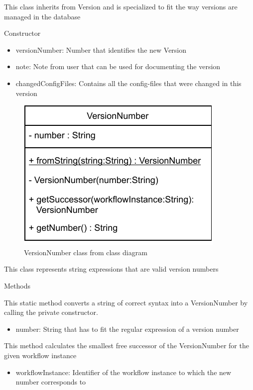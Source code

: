 This class inherits from Version and is specialized to fit the way versions are managed in the database
\begin{methodenv}{Constructor}



\begin{itemize}
	\item{versionNumber:}
	Number that identifies the new Version
	\item{note:}
	Note from user that can be used for documenting the version
	\item{changedConfigFiles:}
	Contains all the config-files that were changed in this version
\end{itemize}
\end{methodenv}


\begin{figure}[h]
\centerline{\includegraphics[scale=1]{res/Klassen/VersionNumber.pdf}}
\caption{VersionNumber class from class diagram}
\end{figure}

This class represents string expressions that are valid version numbers
\begin{methodenv}{Methods}

This static method converts a string of correct syntax into a VersionNumber by calling the private constructor.

\begin{itemize}
	\item{number:}
	String that has to fit the regular expression of a version number
\end{itemize}

This method calculates the smallest free successor of the VersionNumber for the given workflow instance

\begin{itemize}
	\item{workflowInstance:}
	Identifier of the workflow instance to which the new number corresponds to
\end{itemize}
\end{methodenv}


